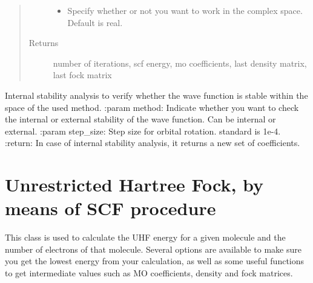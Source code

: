 \documentclass[letterpaper,10pt,english]{sphinxmanual}
\begin{document}
\begin{fulllineitems}
\begin{fulllineitems}
\begin{quote}
\begin{description}
\begin{itemize}
\item {} 
 \textendash{} Specify whether or not you want to work in the complex space. Default is real.

\end{itemize}

\item[{Returns}] \leavevmode
number of iterations, scf energy, mo coefficients, last density matrix, last fock matrix

\end{description}\end{quote}

\end{fulllineitems}


\begin{fulllineitems}
\label{\detokenize{RHF:hf.HartreeFock.RHF.MF.stability_analysis}}
Internal stability analysis to verify whether the wave function is stable within the space of the used method.
:param method: Indicate whether you want to check the internal or external stability of the wave function. Can
be internal or external.
:param step\_size: Step size for orbital rotation. standard is 1e-4.
:return: In case of internal stability analysis, it returns a new set of coefficients.

\end{fulllineitems}


\end{fulllineitems}

\label{\detokenize{UHF:module-hf.HartreeFock.UHF}}

\chapter{Unrestricted Hartree Fock, by means of SCF procedure}
\label{\detokenize{UHF:unrestricted-hartree-fock-by-means-of-scf-procedure}}\label{\detokenize{UHF::doc}}
This class is used to calculate the UHF energy for a given molecule and the number of electrons of that molecule.
Several options are available to make sure you get the lowest energy from your calculation, as well as some useful
functions to get intermediate values such as MO coefficients, density and fock matrices.
\end{document}
